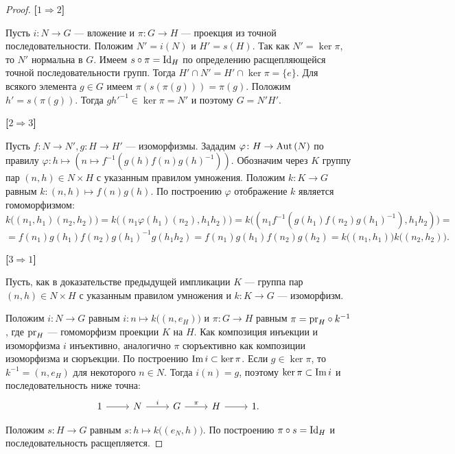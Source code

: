 \begin{proof}
	\hfill
	
	\textbf{[$ 1 \Rightarrow 2 $]}
	
	Пусть $ i \colon N \to G $ --- вложение и $ \pi \colon G \to H $ --- проекция из точной последовательности.
	Положим $ N' = i(N) $ и $ H' = s(H) $. Так как $ N' = \ker \pi $, то $ N' $ нормальна в $ G $.
	Имеем $ s \circ \pi = \mathrm{Id}_H $ по определению расщепляющейся точной последовательности групп.
	Тогда $ H' \cap N' =  H' \cap \ker \pi = \{e\} $.
	Для всякого элемента $ g \in G $ имеем $ \pi(s(\pi(g))) = \pi(g) $.
	Положим $ h' = s(\pi(g)) $.
	Тогда $ gh'^{-1} \in \ker \pi = N' $ и поэтому $ G = N'H' $.
	
	\textbf{[$ 2 \Rightarrow 3 $]}
	
	Пусть $ f \colon N \to N',  g \colon H \to H' $ --- изоморфизмы.
	Зададим $ \varphi \colon H \to \mathrm{Aut}\left(N\right) $ по правилу $ \varphi \colon h \mapsto (n \mapsto f^{-1}(g(h)f(n)g(h)^{-1})) $.
	Обозначим через $ K $ группу пар $ (n, h) \in N \times H $ с указанным правилом умножения.
	Положим $ k \colon K \to G $ равным $ k \colon (n, h) \mapsto f(n)g(h) $.
	По построению $ \varphi $ отображение $ k $ является гомоморфизмом:
	$$ k\big((n_1,h_1)(n_2, h_2)\big) = k \big((n_1\varphi(h_1)(n_2), h_1h_2)\big)
	= k \big((n_1f^{-1}(g(h_1)f(n_2)g(h_1)^{-1}) , h_1h_2) \big) = $$
	$$ = f(n_1)g(h_1)f(n_2)g(h_1)^{-1}g(h_1h_2) = f(n_1)g(h_1)f(n_2)g(h_2)
	= k\big((n_1, h_1) \big) k\big((n_2, h_2) \big). $$
	
	\textbf{[$ 3 \Rightarrow 1 $]}
	
	Пусть, как в доказательстве предыдущей импликации $ K $ --- группа пар $ (n, h) \in N \times H $ с указанным правилом умножения и $ k \colon K \to G $ --- изоморфизм.
	
	Положим $ i \colon N \to G $ равным $ i \colon n \mapsto k\big((n, e_H) \big) $
	и $ \pi \colon G \to H $ равным $ \pi = \mathrm{pr}_{H} \circ k^{-1} $,
	где $ \mathrm{pr}_{H} $ --- гомоморфизм проекции $ K $ на $ H $.
	Как композиция инъекции и изоморфизма $ i $ инъективно,
	аналогично $ \pi $ сюръективно как композиции изоморфизма и сюръекции.
	По построению $ \mathrm{Im} \, i \subset \ker \pi $.
	Если $ g \in \ker \pi $, то $ k^{-1} = (n, e_H) $ для некоторого $ n \in N $.
	Тогда $ i(n) = g $, поэтому $ \ker \pi \subset \mathrm{Im} \, i $ и последовательность ниже точна:
	$$ \begin{tikzcd}
	1 \ar{r}{} & N \ar{r}[above]{i} & G \ar{r}[above]{\pi} & H \ar{r} & 1.
	\end{tikzcd} $$
	
	Положим $ s \colon H \to G $ равным $ s \colon h \mapsto k\big((e_N, h) \big) $.
	По построению $ \pi \circ s = \mathrm{Id}_H $ и последовательность расщепляется.
	
\end{proof}

